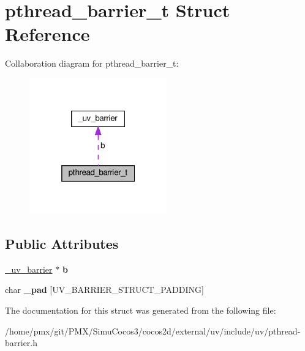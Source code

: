\hypertarget{structpthread__barrier__t}{}\section{pthread\+\_\+barrier\+\_\+t Struct Reference}
\label{structpthread__barrier__t}


Collaboration diagram for pthread\+\_\+barrier\+\_\+t\+:
\nopagebreak
\begin{figure}[H]
\begin{center}
\leavevmode
\includegraphics[width=169pt]{structpthread__barrier__t__coll__graph}
\end{center}
\end{figure}
\subsection*{Public Attributes}
\begin{DoxyCompactItemize}
\item 
\mbox{\label{structpthread__barrier__t_a371f518e76a3d5e9070b7a4140454601}} 
\hyperlink{struct__uv__barrier}{\+\_\+uv\+\_\+barrier} $\ast$ {\bfseries b}
\item 
\mbox{\label{structpthread__barrier__t_a6faad37143965bbda3c23d94faa4a7f6}} 
char {\bfseries \+\_\+pad} \mbox{[}U\+V\+\_\+\+B\+A\+R\+R\+I\+E\+R\+\_\+\+S\+T\+R\+U\+C\+T\+\_\+\+P\+A\+D\+D\+I\+NG\mbox{]}
\end{DoxyCompactItemize}


The documentation for this struct was generated from the following file\+:\begin{DoxyCompactItemize}
\item 
/home/pmx/git/\+P\+M\+X/\+Simu\+Cocos3/cocos2d/external/uv/include/uv/pthread-\/barrier.\+h\end{DoxyCompactItemize}
